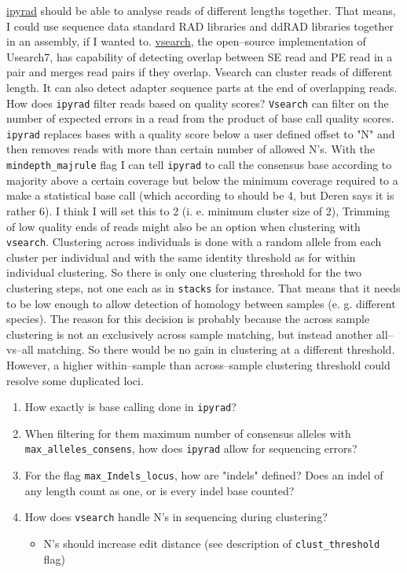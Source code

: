 \documentclass{article}\usepackage[]{graphicx}\usepackage[]{color}
\begin{document}
\href{http://ipyrad.readthedocs.io/files.html}{ipyrad} should be able to analyse reads of different lengths together. That means, I could use sequence data standard RAD libraries and ddRAD libraries together in an assembly, if I wanted to. \href{https://github.com/torognes/vsearch}{vsearch}, the open--source implementation of Usearch7, has capability of detecting overlap between SE read and PE read in a pair and merges read pairs if they overlap. Vsearch can cluster reads of different length. It can also detect adapter sequence parts at the end of overlapping reads. How does \texttt{ipyrad} filter reads based on quality scores? \texttt{Vsearch} can filter on the number of expected errors in a read from the product of base call quality scores. \texttt{ipyrad} replaces bases with a quality score below a user defined offset to "N" and then removes reads with more than certain number of allowed N's. With the \texttt{mindepth\_majrule} flag I can tell \texttt{ipyrad} to call the consensus base according to majority above a certain coverage but below the minimum coverage required to a make a statistical base call (which according to \citealt{Lynch2008} should be 4, but Deren says it is rather 6). I think I will set this to 2 (i. e. minimum cluster size of 2), Trimming of low quality ends of reads might also be an option when clustering with \texttt{vsearch}. Clustering across individuals is done with a random allele from each cluster per individual and with the same identity threshold as for within individual clustering. So there is only one clustering threshold for the two clustering steps, not one each as in \texttt{stacks} for instance. That means that it needs to be low enough to allow detection of homology between samples (e. g. different species). The reason for this decision is probably because the across sample clustering is not an exclusively across sample matching, but instead another all--vs--all matching. So there would be no gain in clustering at a different threshold. However, a higher within--sample than across--sample clustering threshold could resolve some duplicated loci.

\begin{enumerate}
\item How exactly is base calling done in \texttt{ipyrad}?
\item When filtering for them maximum number of consensus alleles with \texttt{max\_alleles\_consens}, how does \texttt{ipyrad} allow for sequencing errors?
\item For the flag \texttt{max\_Indels\_locus}, how are "indels" defined? Does an indel of any length count as one, or is every indel base counted?
\item How does \texttt{vsearch} handle N's in sequencing during clustering?
\begin{itemize}
\item N's should increase edit distance (see description of \texttt{clust\_threshold} flag)
\end{itemize}
\end{enumerate}
\end{document}
